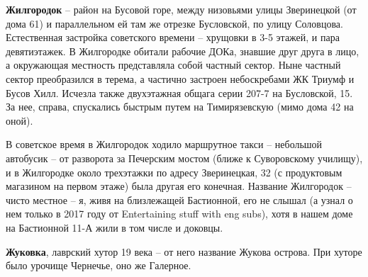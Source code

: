 \medskip

\textbf{Жилгородок} – район на Бусовой горе, между низовьями улицы Зверинецкой (от дома 61) и параллельном ей там же отрезке Бусловской, по улицу Соловцова. Естественная застройка советского времени – хрущовки в 3-5 этажей, и пара девятиэтажек. В Жилгородке обитали рабочие ДОКа, знавшие друг друга в лицо, а окружающая местность представляла собой частный сектор. Ныне частный сектор преобразился в терема, а частично застроен небоскребами ЖК Триумф и Бусов Хилл. Исчезла также двухэтажная общага серии 207-7 на Бусловской, 15. За нее, справа, спускались быстрым путем на Тимирязевскую (мимо дома 42 на оной).

В советское время в Жилгородок ходило ма\-ршрутное такси – небольшой автобусик – от разворота за Печерским мостом (ближе к Суворовскому училищу), и в Жилгородке около трехэтажки по адресу Зверинецкая, 32 (с продуктовым магазином на первом этаже) была другая его конечная. Название Жилгородок – чисто местное – я, живя на близлежащей Бастионной, его не слышал (а узнал о нем только в 2017 году от Entertaining stuff with eng subs), хотя в нашем доме на Бастионной 11-А жили в том числе и доковцы.\\

\medskip

\textbf{Жуковка}, лаврский хутор 19 века – от него название Жукова острова. При хуторе было урочище Чернечье, оно же Галерное.\\
